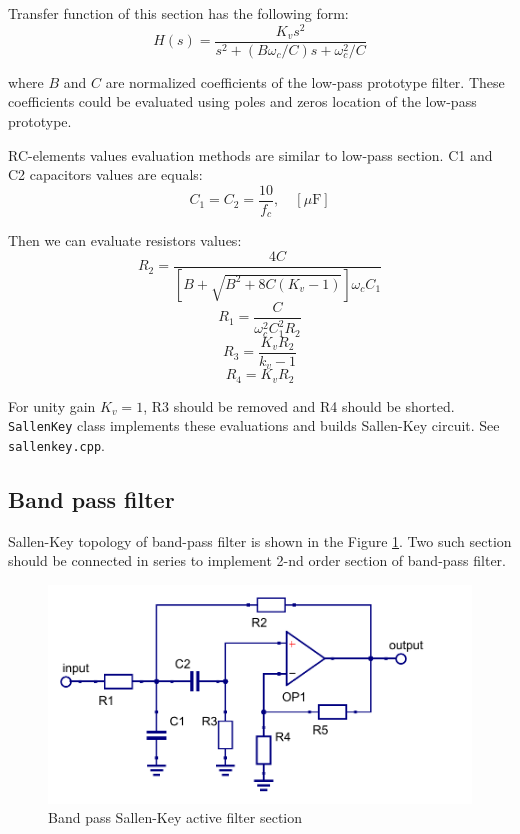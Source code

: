 Transfer function of this section has the following form:
\begin{equation}
 H(s)=\frac{K_vs^2}{s^2+(B\omega_c/C)s+\omega_c^2/C} \label{sk-hpf-trfunc}
\end{equation}

where $B$ and $C$ are normalized coefficients of the low-pass prototype filter.
These coefficients could be evaluated using poles and zeros location of the
low-pass prototype.

RC-elements values evaluation methods are similar to low-pass section. C1 and
C2 capacitors values are equals:
\begin{equation}
 C_1=C_2=\frac{10}{f_c}, \quad [\mu\mbox{F}]
\end{equation}

Then we can evaluate resistors values:
\begin{equation}
 R_2=\frac{4C}{[B+\sqrt{B^2+8C(K_v-1)}]\omega_cC_1}
\end{equation}
\begin{equation}
 R_1=\frac{C}{\omega_c^2C_1^2R_2}
\end{equation}
\begin{equation}
 R_3=\frac{K_vR_2}{k_v-1}
\end{equation}
\begin{equation}
 R_4=K_vR_2
\end{equation}


For unity gain $K_v=1$, R3 should be removed and R4 should be shorted.
\verb|SallenKey| class implements these evaluations and builds Sallen-Key
circuit. See \verb|sallenkey.cpp|.

\subsection{Band pass filter}

Sallen-Key topology of band-pass filter is shown in the Figure
\ref{fig:sk-bpf}. Two such section should be connected in series to implement
2-nd order section of band-pass filter.

\begin{figure}[!ht]
  \centering
  \includegraphics[width=0.6\linewidth]{pics/sk-bpf}
  \caption{Band pass Sallen-Key active filter section}
  \label{fig:sk-bpf}
\end{figure}

